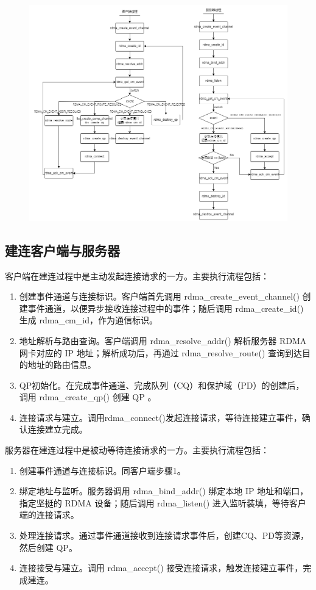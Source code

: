 {\begin{figure}[H]
    \centering
    \includegraphics[width=\textwidth]{Img/RDMACM-connection.png}
    \label{fig:mjiajia-cm-connection}
\end{figure}

\subsection{建连客户端与服务器}

客户端在建连过程中是主动发起连接请求的一方。主要执行流程包括：
\begin{enumerate}[label=\arabic*.]
    \item 创建事件通道与连接标识。客户端首先调用 rdma\_create\_event\_channel() 创建事件通道，以便异步接收连接过程中的事件；随后调用 rdma\_create\_id() 生成 rdma\_cm\_id，作为通信标识。
    \item 地址解析与路由查询。客户端调用 rdma\_resolve\_addr() 解析服务器 RDMA 网卡对应的 IP 地址；解析成功后，再通过 rdma\_resolve\_route() 查询到达目的地址的路由信息。
    \item QP初始化。在完成事件通道、完成队列（CQ）和保护域（PD）的创建后，调用 rdma\_create\_qp() 创建 QP 。
    \item 连接请求与建立。调用rdma\_connect()发起连接请求，等待连接建立事件，确认连接建立完成。
\end{enumerate}


服务器在建连过程中是被动等待连接请求的一方。主要执行流程包括：
\begin{enumerate}[label=\arabic*.]
    \item 创建事件通道与连接标识。同客户端步骤1。
    \item 绑定地址与监听。服务器调用 rdma\_bind\_addr() 绑定本地 IP 地址和端口，指定坚挺的 RDMA 设备；随后调用 rdma\_listen() 进入监听装填，等待客户端的连接请求。
    \item 处理连接请求。通过事件通道接收到连接请求事件后，创建CQ、PD等资源，然后创建 QP。
    \item 连接接受与建立。调用 rdma\_accept() 接受连接请求，触发连接建立事件，完成建连。
\end{enumerate}

}

